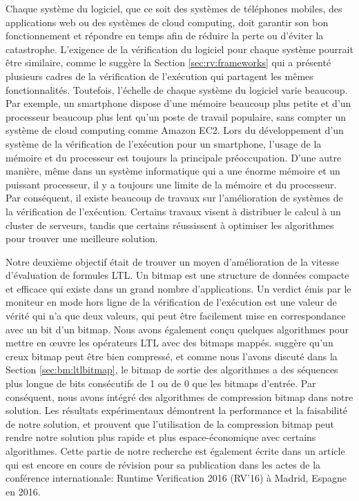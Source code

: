 Chaque système du logiciel, que ce soit des systèmes de téléphones mobiles, des applications web ou des systèmes de cloud computing, doit garantir son bon fonctionnement et répondre en temps afin de réduire la perte ou d'éviter la catastrophe. L'exigence de la vérification du logiciel pour chaque système pourrait être similaire, comme le suggère la Section \ref{sec:rv:frameworks} qui a présenté plusieurs cadres de la vérification de l'exécution qui partagent les mêmes fonctionnalités. Toutefois, l'échelle de chaque système du logiciel varie beaucoup. Par exemple, un smartphone dispose d'une mémoire beaucoup plus petite et d'un processeur beaucoup plus lent qu'un poste de travail populaire, sans compter un système de cloud computing comme Amazon EC2. Lors du développement d'un système de la vérification de l'exécution pour un smartphone, l'usage de la mémoire et du processeur est toujours la principale préoccupation. D'une autre manière, même dans un système informatique qui a une énorme mémoire et un puissant processeur, il y a toujours une limite de la mémoire et du processeur. Par conséquent, il existe beaucoup de travaux sur l'amélioration de systèmes de la vérification de l'exécution. Certains travaux visent à distribuer le calcul à un cluster de serveurs, tandis que certains réussissent à optimiser les algorithmes pour trouver une meilleure solution.

Notre deuxième objectif était de trouver un moyen d'amélioration de la vitesse d'évaluation de formules LTL. Un bitmap est une structure de données compacte et efficace qui existe dans un grand nombre d'applications. Un verdict émis par le moniteur en mode hors ligne de la vérification de l'exécution est une valeur de vérité qui n'a que deux valeurs, qui peut être facilement mise en correspondance avec un bit d'un bitmap. Nous avons également conçu quelques algorithmes pour mettre en \oe{}uvre les opérateurs LTL avec des bitmaps mappés. \cite{lemire2014} suggère qu'un creux bitmap peut être bien compressé, et comme nous l'avons discuté dans la Section \ref{sec:bm:ltlbitmap}, le bitmap de sortie des algorithmes a des séquences plus longue de bits consécutifs de 1 ou de 0 que les bitmaps d'entrée. Par conséquent, nous avons intégré des algorithmes de compression bitmap dans notre solution. Les résultats expérimentaux démontrent la performance et la faisabilité de notre solution, et prouvent que l'utilisation de la compression bitmap peut rendre notre solution plus rapide et plus espace-économique avec certains algorithmes. Cette partie de notre recherche est également écrite dans un article qui est encore en cours de révision pour sa publication dans les actes de la conférence internationale: Runtime Verification 2016 (RV'16) à Madrid, Espagne en 2016.

